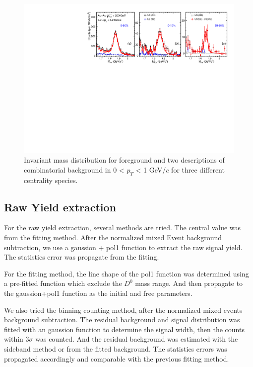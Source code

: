 \begin{figure}[htbp]
\centering
\includegraphics[keepaspectratio,width=1.0\textwidth]{figure/Run14_D0HFT/signal_6_8GeV.pdf}
\caption{Invariant mass distribution for foreground and two descriptions of combinatorial background in 0 < $p_T$ < 1 GeV/$c$ for three different centrality species.}
\label{fig:mixedEvent_pt6_8}
\end{figure}

\subsection{Raw Yield extraction}

For the raw yield extraction, several methods are tried. The central value was from the fitting method. After the normalized mixed Event background subtraction, we use a gaussion + pol1 function to extract the raw signal yield. The statistics error was propagate from the fitting. 

For the fitting method, the line shape of the pol1 function was determined using a pre-fitted function which exclude the $D^0$ mass range. And then propagate to the gaussion+pol1 function as the initial and free parameters.

We also tried the binning counting method, after the normalized mixed events background subtraction. The residual background and signal distribution was fitted with an gaussion function to determine the signal width, then the counts within 3$\sigma$ was counted. And the residual background was estimated with the sideband method or from the fitted background. The statistics errors was propagated accordingly and comparable with the previous fitting method.

